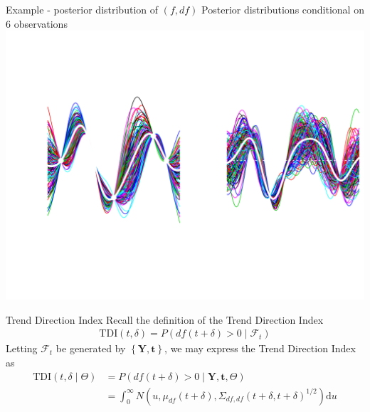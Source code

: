 \documentclass[ignorenonframetext,xcolor=pdflatex,table,dvipsnames,serif]{beamer}
\begin{document}
\begin{frame}{Example - posterior distribution of $(f, df)$}
  Posterior distributions conditional on 6 observations
  \center\includegraphics[scale=0.5]{postAni07}
\end{frame}


\begin{frame}{Trend Direction Index}
Recall the definition of the Trend Direction Index
\begin{align*}
  \mathrm{TDI}(t, \delta) = P(df(t + \delta) > 0 \mid \mathcal{F}_t)	
\end{align*}
Letting $\mathcal{F}_t$ be generated by $\left\{\mathbf{Y}, \mathbf{t}\right\}$, we may express the \alert{Trend Direction Index} as
\begin{align*}
  \mathrm{TDI}(t, \delta \mid \Theta) &= P\left(df(t + \delta) > 0 \mid \mathbf{Y}, \mathbf{t}, \Theta\right)\\
        &= \int_0^\infty N\left(u, \mu_{df}(t + \delta), \Sigma_{df,df}(t + \delta,t + \delta)^{1/2}\right)\mathrm{d}u
\end{align*}
\end{frame}
\end{document}
